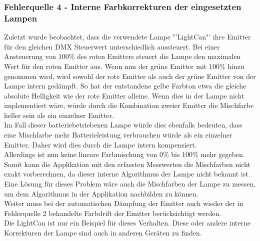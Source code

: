 \documentclass[11pt]{scrartcl}
\begin{document}
\subsubsection{Fehlerquelle 4 - Interne Farbkorrekturen der eingesetzten Lampen}
Zuletzt wurde beobachtet, dass die verwendete Lampe "'LightCan"' ihre Emitter für den gleichen DMX
Steuerwert unterschiedlich aussteuert. Bei einer Ansteuerung von 100\% des roten Emitters steuert die Lampe den
maximalen Wert für den roten Emitter aus. Wenn nun der grüne Emitter mit 100\% hinzu genommen wird, wird sowohl der rote Emitter
als auch der grüne Emitter von der Lampe intern gedämpft. So hat der entstandene gelbe Farbton etwa die gleiche absolute
Helligkeit wie der rote Emitter alleine. Wenn dies in der Lampe nicht implementiert wäre, würde durch die Kombination zweier
Emitter die Mischfarbe heller sein als ein einzelner Emitter.\\
Im Fall dieser batteriebetriebenen Lampe würde dies ebenfalls bedeuten, dass eine Mischfarbe mehr Batterieleistung verbrauchen
würde als ein einzelner Emitter. Daher wird dies durch die Lampe intern kompensiert.\\
Allerdings ist nun keine lineare Farbmischung von 0\% bis 100\% mehr gegeben. Somit kann die Applikation mit den erfassten
Messwerten die Mischfarben nicht exakt vorberechnen, da dieser interne Algorithmus der Lampe nicht bekannt ist.\\
Eine Lösung für dieses Problem wäre auch die Mischfarben der Lampe zu messen, um dem Algorithmus in der Applikation nachbilden
zu können.\\
Weiter muss bei der automatischen Dämpfung der Emitter auch wieder der in Fehlerquelle 2 behandelte Farbdrift der Emitter
berücksichtigt werden.\\
Die LightCan ist nur ein Beispiel für dieses Verhalten. Diese oder andere interne Korrekturen der Lampe sind auch in anderen
Geräten zu finden.
\clearpage

\end{document}
